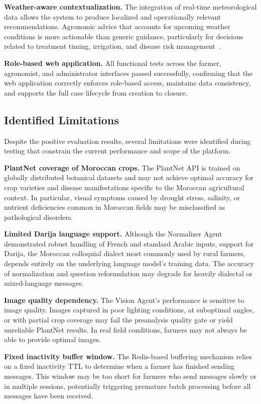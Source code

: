 \textbf{Weather-aware contextualization.} The integration of real-time meteorological data allows the system to produce localized and operationally relevant recommendations. Agronomic advice that accounts for upcoming weather conditions is more actionable than generic guidance, particularly for decisions related to treatment timing, irrigation, and disease risk management~\cite{worldbank2024irrigation}.

\textbf{Role-based web application.} All functional tests across the farmer, agronomist, and administrator interfaces passed successfully, confirming that the web application correctly enforces role-based access, maintains data consistency, and supports the full case lifecycle from creation to closure.

\subsection{Identified Limitations}

Despite the positive evaluation results, several limitations were identified during testing that constrain the current performance and scope of the platform.

\textbf{PlantNet coverage of Moroccan crops.} The PlantNet API is trained on globally distributed botanical datasets and may not achieve optimal accuracy for crop varieties and disease manifestations specific to the Moroccan agricultural context. In particular, visual symptoms caused by drought stress, salinity, or nutrient deficiencies common in Moroccan fields may be misclassified as pathological disorders.

\textbf{Limited Darija language support.} Although the Normalizer Agent demonstrated robust handling of French and standard Arabic inputs, support for Darija, the Moroccan colloquial dialect most commonly used by rural farmers, depends entirely on the underlying language model's training data. The accuracy of normalization and question reformulation may degrade for heavily dialectal or mixed-language messages.

\textbf{Image quality dependency.} The Vision Agent's performance is sensitive to image quality. Images captured in poor lighting conditions, at suboptimal angles, or with partial crop coverage may fail the preanalysis quality gate or yield unreliable PlantNet results. In real field conditions, farmers may not always be able to provide optimal images.

\textbf{Fixed inactivity buffer window.} The Redis-based buffering mechanism relies on a fixed inactivity TTL to determine when a farmer has finished sending messages. This window may be too short for farmers who send messages slowly or in multiple sessions, potentially triggering premature batch processing before all messages have been received.

